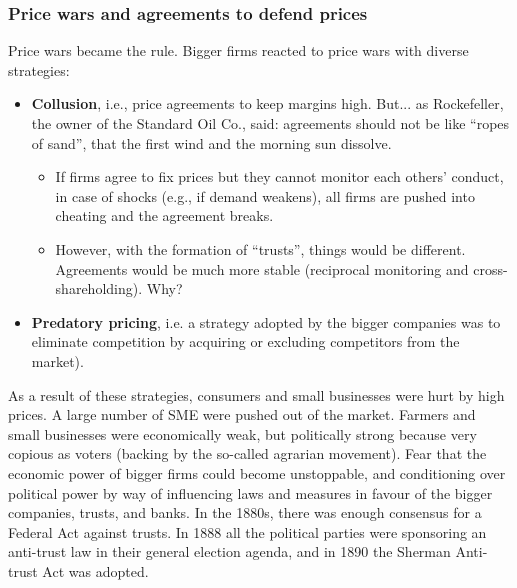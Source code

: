             

        \subsubsection{Price wars and agreements to defend prices}
            Price wars became the rule. Bigger firms reacted to price wars with diverse strategies: 
            \begin{itemize}
                \item \textbf{Collusion}, i.e., price agreements to keep margins high. But... as Rockefeller, the owner of the Standard Oil Co., said: agreements should not be like “ropes of sand”, that the first wind and the morning sun dissolve.  
                \begin{itemize}
                    \item If firms agree to fix prices but they cannot monitor each others’ conduct, in case of shocks (e.g., if demand weakens), all firms are pushed into cheating and the agreement breaks.
                    \item However, with the formation of “trusts”, things would be different. Agreements would be much more stable (reciprocal monitoring and cross-shareholding). Why?
                \end{itemize}
                \item \textbf{Predatory pricing}, i.e. a strategy adopted by the bigger companies was to eliminate competition by acquiring or excluding competitors from the market). 
            \end{itemize}


            As a result of these strategies, consumers and small businesses were hurt by high prices. 
            A large number of SME were pushed out of the market. Farmers and small businesses were economically weak, but politically strong because very copious as voters (backing by the so-called agrarian movement).
            Fear that the economic power of bigger firms could become unstoppable, and conditioning over political power by way of influencing laws and measures in favour of the bigger companies, trusts, and banks.  
            In the 1880s, there was enough consensus for a Federal Act against trusts. In 1888 all the political parties were sponsoring an anti-trust law in their general election agenda, and in 1890 the Sherman Anti-trust Act was adopted.

